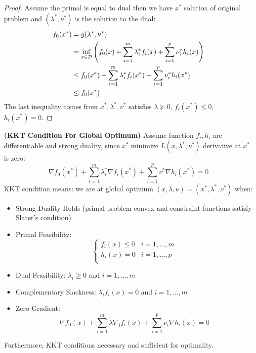 \begin{proof}
    Assume the primal is equal to dual then we have $x^*$ solution of original problem and $(\lambda^*, \nu^*)$ is the solution to the dual:
    \begin{equation*}
    \begin{aligned}
        f_0(x^*) &= g(\lambda^*, \nu^*) \\
        &= \inf_{x\in\mathcal{D}}\left( f_0(x) + \sum^m_{i=1}\lambda^*_if_i(x) + \sum^p_{i=1}\nu^*_ih_i(x) \right) \\
        &\le f_0(x^*) + \sum^m_{i=1}\lambda^*_if_i(x^*) + \sum^p_{i=1}\nu^*_ih_i(x^*) \\
        &\le f_0(x^*)
    \end{aligned}
    \end{equation*}
    The last inequality comes from $x^*, \lambda^*, \nu^*$ satisfies $\lambda\succeq0$, $f_i(x^*)\le0$, $h_i(x^*)=0$. 
\end{proof}

\begin{definition}{\textbf{(KKT Condition For Global Optimum)}}
    Assume function $f_i, h_i$ are differentiable and strong duality, since $x^*$ minimize $L(x, \lambda^*,\nu^*)$ derivative at $x^*$ is zero:
    \begin{equation*}
        \nabla f_0(x^*) + \sum^m_{i=1}\lambda^*_i\nabla f_i(x^*) + \sum^p_{i=1}\nu^*\nabla h_i(x^*) = 0
    \end{equation*}
    KKT condition means: we are at global optimum $(x, \lambda, \nu) = (x^*, \lambda^*, \nu^*)$ when:
    \begin{itemize}
        \item Strong Duality Holds (primal problem convex and constraint functions satisfy Slater's condition)
        \item Primal Feasibility: 
        \begin{equation*}
            \begin{cases}
                f_i(x) \le 0 & i=1,\dots,m\\
                h_i(x) = 0 & i=1,\dots,p\\
            \end{cases}
        \end{equation*}
        \item Dual Feasibility: $\lambda_i\ge0$ and $i=1,\dots,m$ 
        \item Complementary Slackness: $\lambda_if_i(x)=0$ and $i=1,\dots,m$
        \item Zero Gradient:
        \begin{equation*}
            \nabla f_0(x) + \sum^m_{i=1}\lambda\nabla_if_i(x) + \sum^p_{i=1}\nu_i\nabla h_i(x) = 0
        \end{equation*}
    \end{itemize}
    Furthermore, KKT conditions necessary and sufficient for optimality.
\end{definition}

